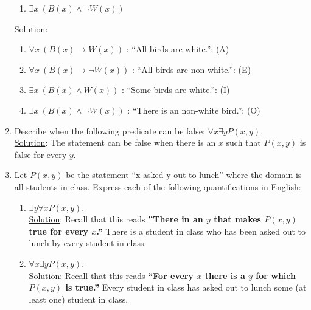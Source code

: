 \documentclass[12pt]{article}
\begin{document}
\begin{enumerate}
\begin{enumerate}
\item $\exists x~(B(x) \wedge \neg W(x))$ 
\end{enumerate}

\noindent \underline{Solution}: \\

\begin{enumerate}
\item $\forall x~(B(x) \rightarrow W(x))$ : ``All birds are white.'': (A)
\item $\forall x~(B(x) \rightarrow \neg W(x))$ : ``All birds are non-white.'': (E)
\item $\exists x~(B(x) \wedge W(x))$ : ``Some birds are white.'': (I)
\item $\exists x~(B(x) \wedge \neg W(x))$ : ``There is an non-white bird.'': (O)
\end{enumerate}


\item Describe when the following predicate can be false: $\forall x \exists y P(x, y)$.\\

\noindent \underline{Solution}: The statement can be false when there is an $x$ such that $P(x, y)$ is false for every $y$.



\item Let $P(x, y)$ be the statement ``x asked y out to lunch'' where the domain is all students in class. Express each of the following quantifications in English:

\begin{enumerate}
\item $\exists y \forall x P(x, y)$.\\

\noindent \underline{Solution}: Recall that this reads \textbf{''There in an $y$ that makes $P(x, y)$ true for every $x$.''} There is a student in class who has been asked out to lunch by every student in class.\\

\item $\forall x \exists y P(x, y)$.\\

\noindent \underline{Solution}: Recall that this reads \textbf{``For every $x$ there is a $y$ for which $P(x, y)$ is true.''} Every student in class has asked out to lunch some (at least one) student in class.
\end{enumerate}


\end{enumerate}
\end{document}
